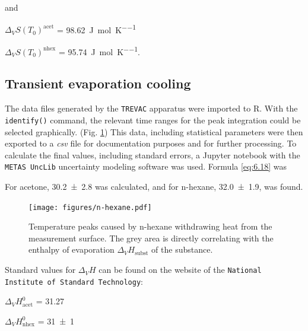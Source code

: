 {and

$\Delta_VS(T_0)^{\text{acet}}$ = \qty{98.62}{\joule\per\mole\per\kelvin}

$\Delta_VS(T_0)^{\text{nhex}}$ = \qty{95.74}{\joule\per\mole\per\kelvin}.





\subsection{Transient evaporation cooling}
The data files generated by the \texttt{TREVAC} apparatus were imported to R. With the \texttt{identify()} command, the relevant time ranges for the peak integration could be selected graphically. (Fig. \ref{fig:nhex_peaks}) This data, including statistical parameters were then exported to a \textit{csv} file for documentation purposes and for further processing. To calculate the final values, including standard errors, a Jupyter notebook \cite{IPython:2007} with the \texttt{METAS UncLib} uncertainty modeling software \cite{unclib} was used. Formula \ref{eq:6.18} was 

For acetone, \qty{30.2 \pm 2.8}{\kJpmole} was calculated, and for n-hexane, \qty{32.0 \pm 1.9}{\kJpmole}, was found.

\begin{figure}[H]
    \centering
    \texttt{[image: figures/n-hexane.pdf]}
    \caption{Temperature peaks caused by n-hexane withdrawing heat from the measurement surface. The grey area is directly correlating with the enthalpy of evaporation $\Delta_VH_{\text{subst}}$ of the substance.}
    \label{fig:nhex_peaks}
\end{figure}

Standard values for $\Delta_VH$ can be found on the website of the \texttt{National Institute of Standard Technology}:

$\Delta_VH^0_{\text{acet}}$ = \qty{31.27}{\kJpmole} \cite{NIST:acet}

$\Delta_VH^0_{\text{nhex}}$ = \qty{31\pm 1}{\kJpmole} \cite{NIST:nhex}

}